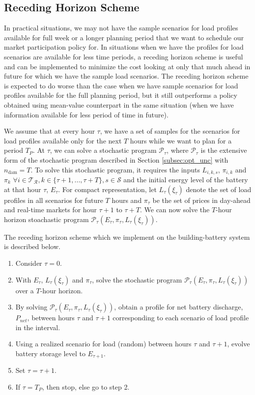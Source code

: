 \documentclass[11pt,twoside]{article}
\begin{document}
\FloatBarrier
\subsection{Receding Horizon Scheme}
In practical situations, we may not have the sample scenarios for load profiles available for full week or a longer planning period that we want to schedule our market participation policy for. In situations when we have the profiles for load scenarios are available for less time periods, a receding horizon scheme is useful and can be implemented to minimize the cost looking at only that much ahead in future for which we have the sample load scenarios. The receding horizon scheme is expected to do worse than the case when we have sample scenarios for load profiles available for the full planning period, but it still outperforms a policy obtained using mean-value counterpart in the same situation (when we have information available for less period of time in future). 

We assume that at every hour $\tau$, we have a set of samples for the scenarios for load profiles available only for the next $T$ hours while we want to plan for a period $T_{P}$. At $\tau$, we can solve a stochastic program $\mathcal{P}_{\tau}$, where $\mathcal{P}_{\tau}$ is the extensive form of the stochastic program described in Section \ref{subsec:opt_unc} with $n_\text{dam} = T$. To solve this stochastic program, it requires the inputs $L_{i,k,s}$, $\pi_{i,k}$ and $\pi_k$ $\forall i \in \mathcal{T_R}, k \in \{\tau+1, ..., \tau+T\}, s \in \mathcal{S}$ and the initial energy level of the battery at that hour $\tau$, $E_{\tau}$. For compact representation, let $L_{\tau}(\xi_{\tau})$ denote the set of load profiles in all scenarios for future $T$ hours and $\pi_{\tau}$ be the set of prices in day-ahead and real-time markets for hour $\tau+1$ to $\tau+T$. We can now solve the $T$-hour horizon stoachastic program $\mathcal{P}_{\tau}\left(E_{\tau}, \pi_{\tau}, L_{\tau}(\xi_{\tau})\right)$.

The receding horizon scheme which we implement on the building-battery system is described below.
\begin{enumerate}
\item Consider $\tau = 0$.
\item With $E_\tau$, $L_{\tau}(\xi_{\tau})$ and $\pi_{\tau}$, solve the stochastic program $\mathcal{P}_{\tau}\left(E_{\tau}, \pi_{\tau}, L_{\tau}(\xi_{\tau})\right)$ over a $T$-hour horizon.
\item By solving $\mathcal{P}_{\tau}\left(E_{\tau}, \pi_{\tau}, L_{\tau}(\xi_{\tau})\right)$, obtain a profile for net battery discharge, $P_{net}$, between hours $\tau$ and $\tau+1$ corresponding to each scenario of load profile in the interval.
\item Using a realized scenario for load (random) between hours $\tau$ and $\tau+1$, evolve battery storage level to $E_{\tau+1}$.
\item Set $\tau = \tau+1$.
\item If $\tau = T_P$, then stop, else go to step 2.
\end{enumerate}
\end{document}
